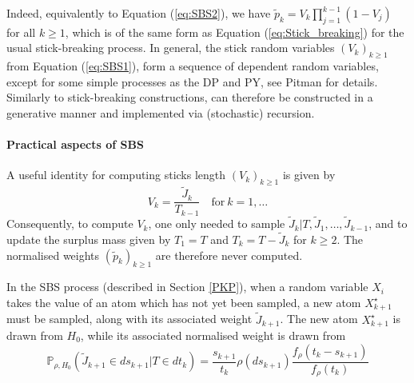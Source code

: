 Indeed, equivalently to Equation (\ref{eq:SBS2}), we have $\tilde{p}_k = V_k \prod_{j=1}^{k-1}{(1-V_j)}$ for all $k \ge 1$, which is of the same form as Equation (\ref{eq:Stick_breaking}) for the usual stick-breaking process.
In general, the stick random variables $(V_k)_{k \ge 1}$ from Equation (\ref{eq:SBS1}), form a sequence of dependent random variables, except for some simple processes as the \gls{DP} and \gls{PY}, see Pitman \cite{PitmanRDD} for details.
Similarly to stick-breaking constructions,  can therefore be constructed in a generative manner and implemented via (stochastic) recursion.


\paragraph{Practical aspects of \gls{SBS}}

A useful identity for computing sticks length $(V_k)_{k \ge 1}$ is given by
\begin{equation} \label{eq:SBS4}
V_k = \frac{\tilde{J}_k}{T_{k-1}} \quad \text{for} \ k=1,\dots
\end{equation}
Consequently, to compute $V_k$, one only needed to sample $\tilde{J}_{k}|T,\tilde{J}_1,\dots,\tilde{J}_{k-1}$, and to update the surplus mass given by $T_1 = T$ and $T_k = T - \tilde{J}_k$ for $k \ge 2$.
The normalised weights $(\tilde{p}_k)_{k \ge 1}$ are therefore never computed.

In the \acrlong{SBS} process (described in Section \ref{PKP}), when a random variable $X_i$ takes the value of an atom which has not yet been sampled, a new atom $X^\star_{k+1}$ must be sampled, along with its associated weight $\tilde{J}_{k+1}$. The new atom $X_{k+1}^\star$ is drawn from $H_0$, while its associated normalised weight is drawn from
\begin{equation} \label{eq:SBS3}
\mathbb{P}_{\rho,H_0}(\tilde{J}_{k+1} \in ds_{k+1} | T \in dt_k) = \frac{s_{k+1}}{t_k}\rho(ds_{k+1})\frac{f_\rho(t_k - s_{k+1})}{f_\rho(t_k)}
\end{equation}

